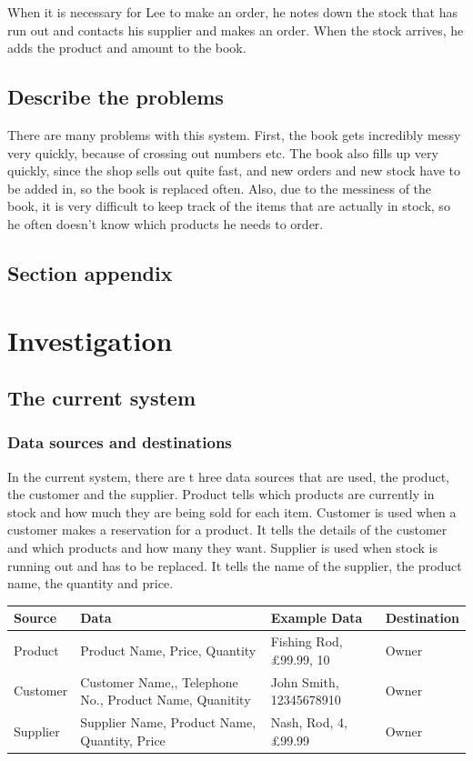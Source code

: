 When it is necessary for Lee to make an order, he notes down the stock that has run out and contacts his supplier and makes an order. When the stock arrives, he adds the product and amount to the book.

\subsection{Describe the problems}
There are many problems with this system. First, the book gets incredibly messy very quickly, because of crossing out numbers etc. The book also fills up very quickly, since the shop sells out quite fast, and new orders and new stock have to be added in, so the book is replaced often. Also, due to the messiness of the book, it is very difficult to keep track of the items that are actually in stock, so he often doesn't know which products he needs to order. 

\subsection{Section appendix}

\section{Investigation}

\subsection{The current system}

\subsubsection{Data sources and destinations}
In the current system, there are t hree data sources that are used, the product, the customer and the supplier. Product tells which products are currently in stock and how much they are being sold for each item. Customer is used when a customer makes a reservation for a product. It tells the details of the customer and which products and how many they want. Supplier is used when stock is running out and has to be replaced. It tells the name of the supplier, the product name, the quantity and price.

\begin{center}
\begin{tabular}{| l | p{5cm} | l | l |}
    \hline
    \textbf{Source} & \textbf{Data} & \textbf{Example Data} & \textbf{Destination} \\ \hline
    Product & Product Name, Price, Quantity & Fishing Rod, £99.99, 10 & Owner \\ \hline
    Customer & Customer Name,, Telephone No., Product Name, Quanitity & John Smith, 12345678910 & Owner \\ \hline
    Supplier & Supplier Name, Product Name, Quantity, Price & Nash, Rod, 4, £99.99 & Owner \\ \hline
  
\end{tabular}
\label{tab:range_examples}
\end{center}


